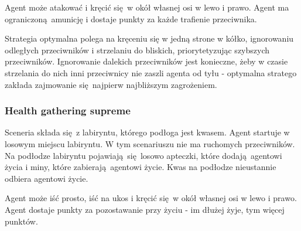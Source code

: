 Agent może atakować i kręcić się w okół własnej osi w lewo i prawo. Agent ma ograniczoną amunicję i dostaje punkty za każde trafienie przeciwnika.

Strategia optymalna polega na kręceniu się w jedną strone w kółko, ignorowaniu odległych przeciwników i strzelaniu do bliskich, priorytetyzując szybszych przeciwników. Ignorowanie dalekich przeciwników jest konieczne, żeby w czasie strzelania do nich inni przeciwnicy nie zaszli agenta od tyłu - optymalna stratego zakłada zajmowanie się najpierw najbliższym zagrożeniem.

\begin{figure}[H]
	\begin{floatrow}
	\end{floatrow}
\end{figure}


\subsubsection{Health gathering supreme}\label{scenario_hgs}
Sceneria składa się z labiryntu, którego podłoga jest kwasem. Agent startuje w losowym miejscu labiryntu. W tym scenariuszu nie ma ruchomych przeciwników. Na podłodze labiryntu pojawiają się losowo apteczki, które dodają agentowi życia i miny, które zabierają agentowi życie. Kwas na podłodze nieustannie odbiera agentowi życie. 

Agent może iść prosto, iść na ukos i kręcić się w okół własnej osi w lewo i prawo. Agent dostaje punkty za pozostawanie przy życiu - im dłużej żyje, tym więcej punktów.

